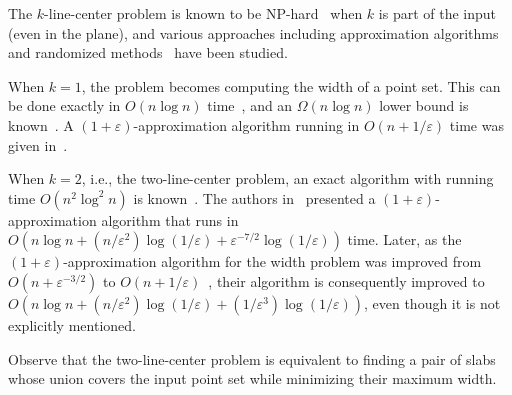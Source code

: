 \documentclass[english,a4paper, cleveref, autoref, thm-restate, nolineno]{socg-lipics-v2021}
\theoremstyle{star}
\theoremstyle{claimstar}
\newcommand{\eps}{\ensuremath{\varepsilon}}
\begin{document}
The $k$-line-center problem is known to be NP-hard~\cite{Megiddo1982pc_npcomplete} when $k$ is part of the input (even in the plane), 
and various approaches including approximation algorithms and randomized methods~\cite{  pc_apx_dklogk, agarwal2005approximation, pc_shapefitting_cylinder,pc_shapefitting_box, chan2006faster,  pc_greedy_number_apx, pc_fixedkq,HASSIN199129_pc_hitting, pc_montecarlo} have been studied.  


When $k=1$, the problem becomes computing the width of a point set.  
This can be done exactly in $O(n\log n)$ time~\cite{Shamos:1978:CG:width}, and an $\Omega(n\log n)$ lower bound is known~\cite{lee1986geometric}.  
A $(1+\eps)$-approximation algorithm running in $O(n + 1/\eps)$ time was given in~\cite{chan2006faster}.

When $k=2$, i.e., the two-line-center problem, an exact algorithm with running time $O(n^2\log^2 n)$ is known~\cite{jaromczyk1995}.  
The authors in~\cite{agarwalTwo} presented a $(1+\eps)$-approximation algorithm that runs in  
$O(n\log n + (n/\eps^2)\log(1/\eps) + \eps^{-7/2}\log(1/\eps))$ time.  
Later, as the $(1+\eps)$-approximation algorithm for the width problem was improved from  
$O(n + \eps^{-3/2})$ to $O(n + 1/\eps)$~\cite{chan2006faster},  
their algorithm is consequently improved to $O(n\log n + ({n}/{\eps^2}) \log ({1}/{\eps}) + (1/\eps^3)\log ({1}/{\eps}))$, even though it is not explicitly mentioned. 


Observe that the two-line-center problem is equivalent to finding a pair of slabs whose union covers the input point set while minimizing their maximum width. 
\end{document}
